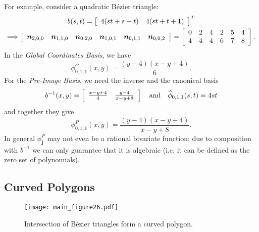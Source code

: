 \documentclass[letterpaper,10pt]{article}
\theoremstyle{definition}
\begin{document}
\noindent For example, consider a quadratic B\'{e}zier triangle:
\begin{gather}
b(s, t) = \left[ \begin{array}{c c}
    4 (s t + s + t) & 4 (s t + t + 1)
  \end{array}\right]^T \\
\Longrightarrow
\left[ \begin{array}{c c c c c c}
    \bm{n}_{2, 0, 0} &
    \bm{n}_{1, 1, 0} &
    \bm{n}_{0, 2, 0} &
    \bm{n}_{1, 0, 1} &
    \bm{n}_{0, 1, 1} &
    \bm{n}_{0, 0, 2}
  \end{array}\right] = \left[ \begin{array}{c c c c c c}
    0 & 2 & 4 & 2 & 5 & 4 \\
    4 & 4 & 4 & 6 & 7 & 8
  \end{array}\right].
\end{gather}
In the \emph{Global Coordinates Basis}, we have
\begin{equation}
\phi^{G}_{0, 1, 1}(x, y) = \frac{(y - 4) (x - y + 4)}{6}.
\end{equation}
For the \emph{Pre-Image Basis}, we need the inverse
and the canonical basis
\begin{equation}
b^{-1}(x, y) = \left[ \begin{array}{c c}
    \frac{x - y + 4}{4} & \frac{y - 4}{x - y + 8}
  \end{array}\right] \quad \text{and} \quad
\widehat{\phi}_{0, 1, 1}(s, t) = 4 s t
\end{equation}
and together they give
\begin{equation}
\phi^{P}_{0, 1, 1}(x, y) = \frac{(y - 4) (x - y + 4)}{x - y + 8}.
\end{equation}
In general \(\phi_{\bm{j}}^P\) may not even be a rational bivariate
function; due to composition with \(b^{-1}\) we can only guarantee that
it is algebraic (i.e. it can be defined as the zero set of polynomials).

\subsection{Curved Polygons}\label{subsec:curved-polygons}

\begin{figure}
  \texttt{[image: main\_figure26.pdf]}
  \centering
  \captionsetup{width=.75\linewidth}
  \caption{Intersection of B\'{e}zier triangles form a curved polygon.}
  \label{fig:bezier-triangle-intersect}
\end{figure}
\end{document}
